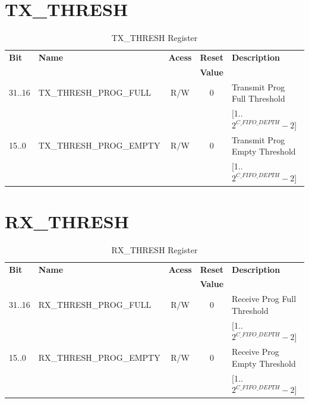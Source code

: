 \section{TX\_THRESH}
\begin{table}[!h]
	\centering
		\begin{tabular} {|l|l|c|c|l|} \hline
		\textbf{Bit}		& \textbf{Name}	& \textbf{Acess} & \textbf{Reset}				& \textbf{Description} 				\\ 
										&								&								 & \textbf{Value}				&															\\ \hline		
	  31..16					& TX\_THRESH\_PROG\_FULL 	& R/W	 & 0										& Transmit Prog Full Threshold\\
	  								&								&								 &											& [1..$2^{C\_FIFO\_DEPTH}-2$]	\\ \hline
	  15..0						& TX\_THRESH\_PROG\_EMPTY	& R/W	 & 0										& Transmit Prog Empty	Threshold\\
	  								&								&								 &											& [1..$2^{C\_FIFO\_DEPTH}-2$]	\\ \hline
	\end{tabular}
	\caption{TX\_THRESH Register}
	\label{tab:TX_THRESH}
\end{table}


\section{RX\_THRESH}
\begin{table}[!h]
	\centering
		\begin{tabular} {|l|l|c|c|l|} \hline
		\textbf{Bit}		& \textbf{Name}	& \textbf{Acess} & \textbf{Reset}				& \textbf{Description} 				\\
										&								&								 & \textbf{Value}				&															\\ \hline
	  31..16					& RX\_THRESH\_PROG\_FULL 	& R/W	 & 0										& Receive Prog Full Threshold	\\
	  								&								&								 &											& [1..$2^{C\_FIFO\_DEPTH}-2$] \\ \hline
	  15..0						& RX\_THRESH\_PROG\_EMPTY	& R/W	 & 0										& Receive Prog Empty Threshold\\
	  								&								&								 &											& [1..$2^{C\_FIFO\_DEPTH}-2$] \\ \hline					\end{tabular}
	\caption{RX\_THRESH Register}
	\label{tab:RX_THRESH}
\end{table}


